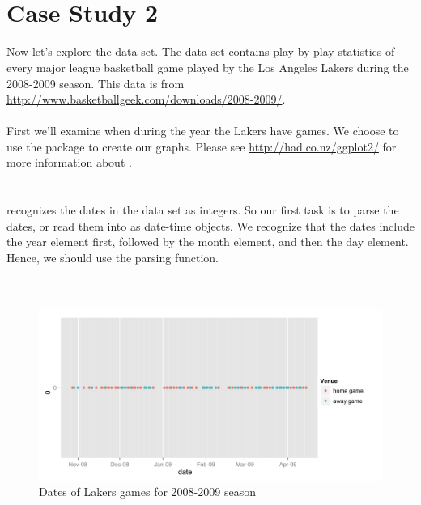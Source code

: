 \documentclass[article]{jss}
\begin{document}
\\
\\


\section{Case Study 2}
Now let's explore the  data set. The  data set contains play by play statistics of every major league basketball game played by the Los Angeles Lakers during the 2008-2009 season. This data is from \url{http://www.basketballgeek.com/downloads/2008-2009/}. \\

\\

First we'll examine when during the year the Lakers have games. We choose to use the  package to create our graphs. Please see \url{http://had.co.nz/ggplot2/} for more information about . \\

\\
\\

 recognizes the dates in the  data set as integers. So our first task is to parse the dates, or read them into  as date-time objects. We recognize that the dates include the year element first, followed by the month element, and then the day element. Hence, we should use the  parsing function.\\

\\
\\

\begin{figure}[htpb]
  \centering
  \includegraphics[width=\textwidth]{dates-points.png}        
  \caption{Dates of Lakers games for 2008-2009 season}
  \label{fig:games-date}
\end{figure}
\end{document}
